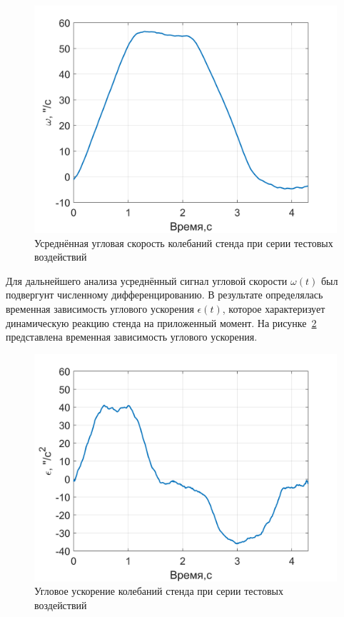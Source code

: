 \begin{figure}[h!]
	\centering
	\includegraphics[scale=0.8]{matlab/img/test-gyro-sum}
	\caption{Усреднённая угловая скорость колебаний стенда при серии тестовых воздействий}
	\label{fig:test-gyro-sum}
\end{figure}

Для дальнейшего анализа усреднённый сигнал угловой скорости $\omega(t)$ был подвергунт численному дифференцированию. В результате определялась временная зависимость углового ускорения $\epsilon(t)$, которое характеризует динамическую реакцию стенда на приложенный момент. 
На рисунке~\cref{fig:test-gyro-acc} представлена временная зависимость углового ускорения.

\begin{figure}[h!]
	\centering
	\includegraphics[scale=0.8]{matlab/img/test-gyro-acc}
	\caption{Угловое ускорение колебаний стенда при серии тестовых воздействий}
	\label{fig:test-gyro-acc}
\end{figure}

